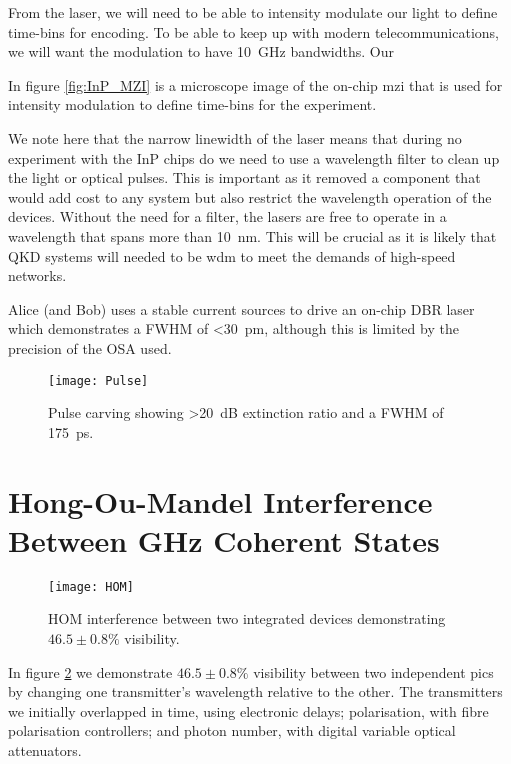 {From the laser, we will need to be able to intensity modulate our light to define time-bins for encoding. To be able to keep up with modern telecommunications, we will want the modulation to have \SI{10}{GHz} bandwidths. Our

In figure \ref{fig:InP_MZI} is a microscope image of the on-chip \ac{mzi} that is used for intensity modulation to define time-bins for the experiment.

We note here that the narrow linewidth of the laser means that during no experiment with the \ac{InP} chips do we need to use a wavelength filter to clean up the light or optical pulses. This is important as it removed a component that would add cost to any system but also restrict the wavelength operation of the devices. Without the need for a filter, the lasers are free to operate in a wavelength that spans more than \SI{10}{nm}. This will be crucial as it is likely that \ac{QKD} systems will needed to be \ac{wdm} to meet the demands of high-speed networks.

Alice (and Bob) uses a stable current sources to drive an on-chip \ac{DBR} laser which demonstrates a \ac{FWHM} of \SI{<30}{pm}, although this is limited by the precision of the \ac{OSA} used.

\begin{figure}[tbp]
	\centering
	\texttt{[image: Pulse]}
	\caption[Pulse carving]{Pulse carving showing \SI{>20}{dB} extinction ratio and a \ac{FWHM} of \SI{175}{\pico\second}.}
	\label{fig:pulses}
\end{figure}

\section{Hong-Ou-Mandel Interference Between GHz Coherent States}

\begin{figure}[tbp]
	\centering
	\texttt{[image: HOM]}
	\caption[Hong-Ou-Mandel interference between integrated devices]{\ac{HOM} interference between two integrated devices demonstrating $46.5\pm0.8\%$ visibility.}
	\label{fig:HOM}
\end{figure}

In figure \ref{fig:HOM} we demonstrate $46.5 \pm 0.8  \%$ visibility between two independent \acp{pic} by changing one transmitter's wavelength relative to the other. The transmitters we initially overlapped in time, using electronic delays; polarisation, with fibre polarisation controllers; and photon number, with digital variable optical attenuators. 

}
